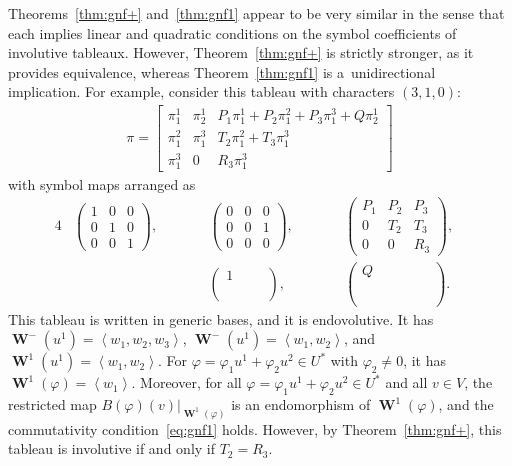 \documentclass[pdftex]{sigma}
\numberwithin{equation}{section}
\newcommand{\pair}[1]{\ensuremath{\left\langle #1 \right\rangle}}
\DeclareMathOperator{\Wu}{\mathbf{W}}
\begin{document}
Theorems~\ref{thm:gnf+} and~\ref{thm:gnf1} appear to be very
similar in the sense that each implies linear and quadratic
conditions on the symbol coef\/f\/icients of involutive tableaux. However, Theorem~\ref{thm:gnf+} is strictly
stronger, as it provides equivalence, whereas Theorem~\ref{thm:gnf1} is a~unidirectional implication.
For example, consider this tableau with characters
$(3 , 1, 0)$:
\begin{gather*}
\pi =
\begin{bmatrix}
\pi^1_1 & \pi^1_2 & P_{1} \pi^1_1 + P_{2} \pi^2_1 + P_{3} \pi^3_1 + Q \pi^1_2 \\
\pi^2_1 & \pi^3_1 & T_{2} \pi^2_1 + T_{3} \pi^3_1 \\
\pi^3_1 & 0 & R_{3} \pi^3_1
\end{bmatrix}
\end{gather*}
with symbol maps arranged as
\begin{alignat*}{4}
&\begin{pmatrix}
1 & 0 & 0 \\
0 & 1 & 0 \\
0 & 0 & 1
\end{pmatrix},
\qquad &&
\begin{pmatrix}
0 & 0 & 0 \\
0 & 0 & 1 \\
0 & 0 & 0
\end{pmatrix},
\qquad & &
\begin{pmatrix}
P_1 & P_2 & P_3 \\
  0 & T_2 & T_3 \\
  0 &   0 & R_3
\end{pmatrix}, & \\
& &&
\begin{pmatrix}
1 & ~ & ~  \\
~ & ~ & ~  \\
~ & ~ & ~  \\
\end{pmatrix},
\qquad &&
\begin{pmatrix}
Q & ~ & ~  \\
\phantom{P_1}  & \phantom{P_2}  & \phantom{P_3} \\
~  & ~  & ~
\end{pmatrix}.&
\end{alignat*}
This tableau is written in generic bases, and it is endovolutive.
It has $\Wu^-(u^1) = \pair{ w_1, w_2, w_3}$, $\Wu^-(u^1) = \pair{ w_1, w_2}$, and
$\Wu^1(u^1) = \pair{w_1,w_2}$.  For $\varphi = \varphi_1 u^1 + \varphi_2 u^2 \in
U^*$ with $\varphi_2 \neq 0$, it has $\Wu^1(\varphi) = \pair{w_1}$.
Moreover, for all $\varphi = \varphi_1 u^1 + \varphi_2 u^2 \in U^*$ and all $v
\in V$, the restricted map $B(\varphi)(v)|_{\Wu^1(\varphi)}$ is an
endomorphism of $\Wu^1(\varphi)$, and the commutativity condition~\eqref{eq:gnf1} holds.
However, by Theorem~\ref{thm:gnf+}, this tableau is involutive if and only if $T_2=R_3$.
\end{document}
